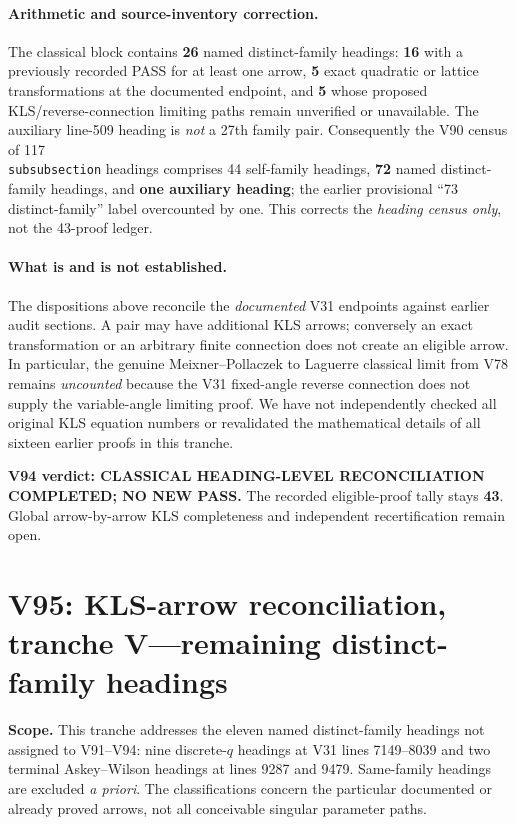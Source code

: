 \documentclass[11pt]{article}
\begin{document}
\paragraph{Arithmetic and source-inventory correction.}
The classical block contains \textbf{26} named distinct-family headings: \textbf{16} with a previously recorded PASS for at least one arrow, \textbf{5} exact quadratic or lattice transformations at the documented endpoint, and \textbf{5} whose proposed KLS/reverse-connection limiting paths remain unverified or unavailable. The auxiliary line-509 heading is \emph{not} a 27th family pair. Consequently the V90 census of 117 \texttt{\\subsubsection} headings comprises 44 self-family headings, \textbf{72} named distinct-family headings, and \textbf{one auxiliary heading}; the earlier provisional ``73 distinct-family'' label overcounted by one. This corrects the \emph{heading census only}, not the 43-proof ledger.

\paragraph{What is and is not established.}
The dispositions above reconcile the \emph{documented} V31 endpoints against earlier audit sections. A pair may have additional KLS arrows; conversely an exact transformation or an arbitrary finite connection does not create an eligible arrow. In particular, the genuine Meixner--Pollaczek to Laguerre classical limit from V78 remains \emph{uncounted} because the V31 fixed-angle reverse connection does not supply the variable-angle limiting proof. We have not independently checked all original KLS equation numbers or revalidated the mathematical details of all sixteen earlier proofs in this tranche.

\noindent\textbf{V94 verdict: CLASSICAL HEADING-LEVEL RECONCILIATION COMPLETED; NO NEW PASS.} The recorded eligible-proof tally stays \textbf{43}. Global arrow-by-arrow KLS completeness and independent recertification remain open.



\section{V95: KLS-arrow reconciliation, tranche V---remaining distinct-family headings}
\noindent\textbf{Scope.} This tranche addresses the eleven named distinct-family headings not assigned to V91--V94: nine discrete-$q$ headings at V31 lines 7149--8039 and two terminal Askey--Wilson headings at lines 9287 and 9479. Same-family headings are excluded \emph{a priori}. The classifications concern the particular documented or already proved arrows, not all conceivable singular parameter paths.
\end{document}
